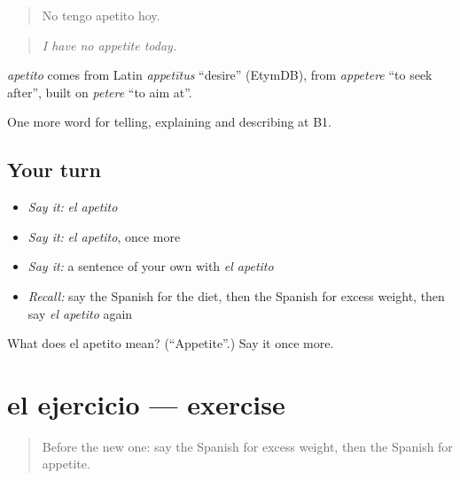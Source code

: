\begin{quote}
No tengo apetito hoy.
\end{quote}

\begin{quote}
\emph{I have no appetite today.}
\end{quote}

\begin{cousinweb}
\emph{apetito} comes from Latin \emph{appetītus} \textquotedblleft{}desire\textquotedblright{} (EtymDB), from \emph{appetere} \textquotedblleft{}to seek after\textquotedblright{}, built on \emph{petere} \textquotedblleft{}to aim at\textquotedblright{}.
\end{cousinweb}

\begin{grammarlens}[title={What you've built}]
One more word for telling, explaining and describing at B1.
\end{grammarlens}

\subsection*{Your turn}
\begin{itemize}
\raggedright
  \item \emph{Say it:} \emph{el apetito}
  \item \emph{Say it:} \emph{el apetito}, once more
  \item \emph{Say it:} a sentence of your own with \emph{el apetito}
  \item \emph{Recall:} say the Spanish for the diet, then the Spanish for excess weight, then say \emph{el apetito} again
\end{itemize}

\begin{tcolorbox}[breakable,colback=teal!4,colframe=teal!35!black,title={Before you move on}]
What does el apetito mean? (\textquotedblleft{}Appetite\textquotedblright{}.) Say it once more.
\end{tcolorbox}
\section[el ejercicio]{el ejercicio — exercise}

\label{lesson:ES-C742-ejercicio}



\begin{quote}
Before the new one: say the Spanish for excess weight, then the Spanish for appetite.
\end{quote}

